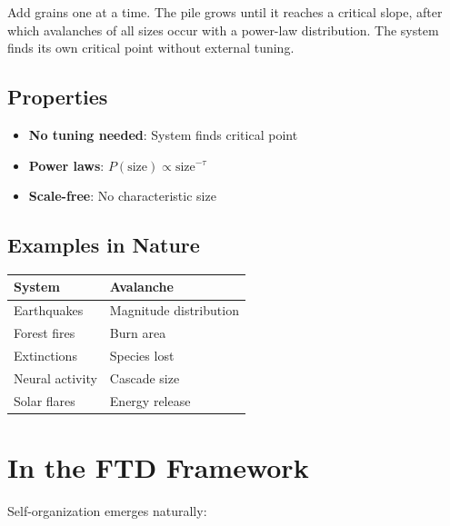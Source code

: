 \documentclass[
  11pt,
  letterpaper,
  twoside,
  openright]{book}
\providecommand{\tightlist}{%
  \setlength{\itemsep}{0pt}\setlength{\parskip}{0pt}}
\begin{document}
Add grains one at a time. The pile grows until it reaches a critical
slope, after which avalanches of all sizes occur with a power-law
distribution. The system finds its own critical point without external
tuning.

\subsection{Properties}\label{properties-21}

\begin{itemize}
\tightlist
\item
  \textbf{No tuning needed}: System finds critical point
\item
  \textbf{Power laws}: \(P(\text{size}) \propto \text{size}^{-\tau}\)
\item
  \textbf{Scale-free}: No characteristic size
\end{itemize}

\subsection{Examples in Nature}\label{examples-in-nature}

\begin{longtable}[]{@{}ll@{}}
\toprule\noalign{}
System & Avalanche \\
\midrule\noalign{}
\endhead
\bottomrule\noalign{}
\endlastfoot
Earthquakes & Magnitude distribution \\
Forest fires & Burn area \\
Extinctions & Species lost \\
Neural activity & Cascade size \\
Solar flares & Energy release \\
\end{longtable}

\section{In the FTD Framework}\label{in-the-ftd-framework-1}

Self-organization emerges naturally:
\end{document}
